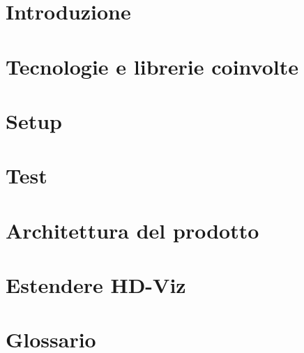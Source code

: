 \documentclass{article}
\begin{document}


\section{Introduzione}
\label{sec:introduzione}


\newpage
\section{Tecnologie e librerie coinvolte}
\label{sec:tech}


\newpage
\section{Setup}
\label{sec:setup}


\newpage
\section{Test}
\label{sec:test}


\newpage
\section{Architettura del prodotto}
\label{sec:arch}


\newpage
\section{Estendere HD-Viz}
\label{sec:estendere}


\newpage
\section{Glossario}
\label{sec:glossario}

\end{document}
